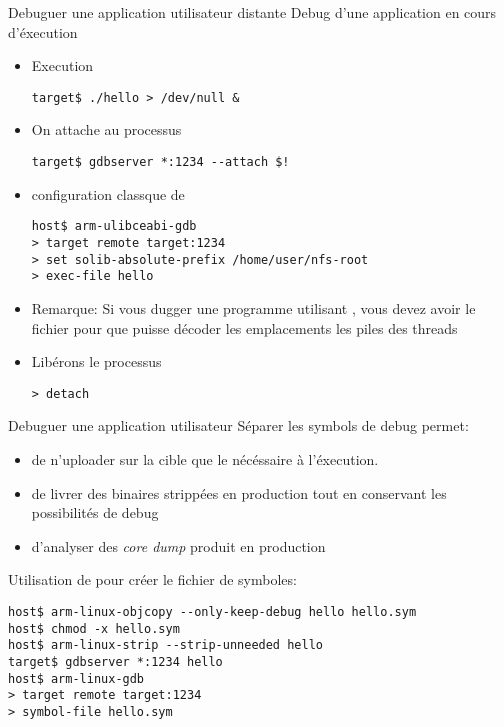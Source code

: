 \begin{frame}[fragile=singleslide]{Debuguer une application utilisateur distante}
  Debug d'une application en cours d'éxecution
  \begin{itemize}
  \item Execution
    \begin{lstlisting}
target$ ./hello > /dev/null &
    \end{lstlisting}
  \item On attache  au processus
    \begin{lstlisting}
target$ gdbserver *:1234 --attach $!
    \end{lstlisting}
  \item configuration classque de 
    \begin{lstlisting}
host$ arm-ulibceabi-gdb
> target remote target:1234
> set solib-absolute-prefix /home/user/nfs-root
> exec-file hello
    \end{lstlisting}
  \item   Remarque:   Si   vous   dugger   une   programme   utilisant
    ,     vous     devez     avoir     le     fichier
      pour   que    puisse   décoder  les
    emplacements les piles des threads
  \item Libérons le processus
    \begin{lstlisting}
> detach
    \end{lstlisting}
  \end{itemize}
\end{frame}

\begin{frame}[fragile=singleslide]{Debuguer une application utilisateur}
  Séparer les symbols  de debug permet:
  \begin{itemize}
  \item de n'uploader sur la cible que le nécéssaire à l'éxecution.
  \item  de  livrer  des  binaires  strippées en  production  tout  en
    conservant les possibilités de debug
  \item d'analyser des \emph{core dump} produit en production
  \end{itemize}
  Utilisation de  pour créer le fichier de symboles:
  \begin{lstlisting}
host$ arm-linux-objcopy --only-keep-debug hello hello.sym
host$ chmod -x hello.sym
host$ arm-linux-strip --strip-unneeded hello
target$ gdbserver *:1234 hello
host$ arm-linux-gdb
> target remote target:1234
> symbol-file hello.sym
    \end{lstlisting}
\end{frame}


